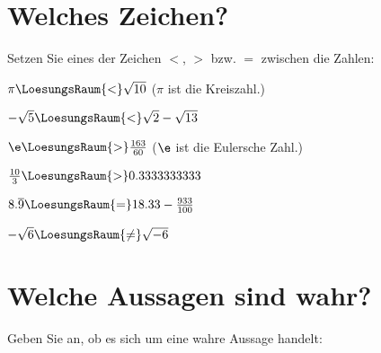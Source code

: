 
\renewcommand{\bbwAufgabenBlockID}{A1ordn}


\usepackage{amssymb} %
\renewcommand{\metaHeaderLine}{Ordnungsrelationen}
\renewcommand{\arbeitsblattTitel}{Arbeitsblatt}

\arbeitsblattHeader{}


\section{Welches Zeichen?}
Setzen Sie eines der Zeichen $<$, $>$ bzw. $=$ zwischen die Zahlen:

\begin{bbwAufgabenBlock}
\item $\pi \LoesungsRaum{<} \sqrt{10}$ ($\pi$ ist die Kreiszahl.)

\item $-\sqrt{5} \LoesungsRaum{<} \sqrt{2}-\sqrt{13}$

\item $\e \LoesungsRaum{>} \frac{163}{60}$ ($\e$ ist die Eulersche Zahl.)

\item $\frac{10}3 \LoesungsRaum{>} 0.3333333333$


\item $8.\overline{9} \LoesungsRaum{=} 18.33 - \frac{933}{100}$

\item $-\sqrt{6} \LoesungsRaum{\ne} \sqrt{-6}$ 

\end{bbwAufgabenBlock}

\platzFuerBerechnungenBisEndeSeite{}


\section{Welche Aussagen sind wahr?}
Geben Sie an, ob es sich um eine wahre Aussage handelt:

